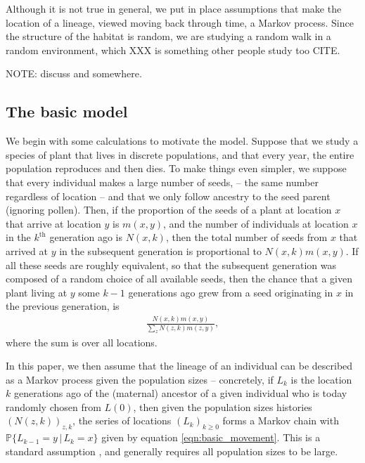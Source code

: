\documentclass{article}
\renewcommand{\P}{\mathbb{P}}
\newcommand{\given}{\,\vert\,}
\begin{document}
Although it is not true in general,
we put in place assumptions that make the location of a lineage,
viewed moving back through time, a Markov process.
Since the structure of the habitat is random,
we are studying a random walk in a random environment,
which XXX is something other people study too CITE.

NOTE: discuss \citet{birkner2013directed} and \citet{birkner2016random} somewhere.

\subsection*{The basic model}

We begin with some calculations to motivate the model.
Suppose that we study a species of plant that lives in discrete populations,
and that every year, the entire population reproduces and then dies.
To make things even simpler, we suppose that every individual makes a large number of seeds,
-- the same number regardless of location --
and that we only follow ancestry to the seed parent (ignoring pollen).
Then, if the proportion of the seeds of a plant at location $x$
that arrive at location $y$ is $m(x,y)$,
and the number of individuals at location $x$ in the $k^\text{th}$ generation ago is $N(x,k)$,
then the total number of seeds from $x$ that arrived at $y$ in the subsequent generation
is proportional to $N(x,k) m(x,y)$.
If all these seeds are roughly equivalent, so that the subsequent generation was composed of a random choice
of all available seeds, then the chance that a given plant living at $y$ some $k-1$ generations ago
grew from a seed originating in $x$ in the previous generation, is
\begin{align} \label{eqn:basic_movement}
    \frac{N(x,k) m(x,y)}{\sum_z N(z,k) m(z,y)},
\end{align}
where the sum is over all locations.

In this paper,
we then assume that the lineage of an individual can be described as a Markov process given the population sizes --
concretely, if $L_k$ is the location $k$ generations ago 
of the (maternal) ancestor of a given individual who is today randomly chosen from $L(0)$,
then given the population sizes histories $(N(z,k))_{z,k}$,
the series of locations $(L_k)_{k \ge 0}$ forms a Markov chain with 
$\P\{L_{k-1} = y \given L_k = x\}$ given by equation \eqref{eqn:basic_movement}.
This is a standard assumption \citep{wakeley2009coalescent},
and generally requires all population sizes to be large.
\end{document}
